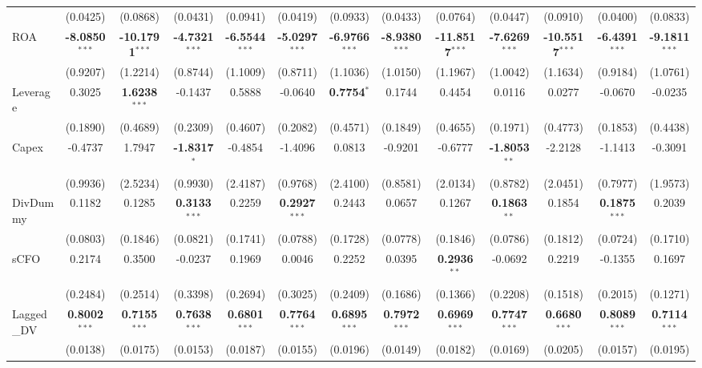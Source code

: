 \documentclass[11pt,a4paper]{article}
\begin{document}
\begin{table}[htbp]
\begin{tabular}{lcccccccccccc}
 & (0.0425) & (0.0868) & (0.0431) & (0.0941) & (0.0419) & (0.0933) & (0.0433) & (0.0764) & (0.0447) & (0.0910) & (0.0400) & (0.0833) \\
ROA & \textbf{-8.0850}$^{***}$ & \textbf{-10.1791}$^{***}$ & \textbf{-4.7321}$^{***}$ & \textbf{-6.5544}$^{***}$ & \textbf{-5.0297}$^{***}$ & \textbf{-6.9766}$^{***}$ & \textbf{-8.9380}$^{***}$ & \textbf{-11.8517}$^{***}$ & \textbf{-7.6269}$^{***}$ & \textbf{-10.5517}$^{***}$ & \textbf{-6.4391}$^{***}$ & \textbf{-9.1811}$^{***}$ \\
 & (0.9207) & (1.2214) & (0.8744) & (1.1009) & (0.8711) & (1.1036) & (1.0150) & (1.1967) & (1.0042) & (1.1634) & (0.9184) & (1.0761) \\
Leverage & 0.3025 & \textbf{1.6238}$^{***}$ & -0.1437 & 0.5888 & -0.0640 & \textbf{0.7754}$^{*}$ & 0.1744 & 0.4454 & 0.0116 & 0.0277 & -0.0670 & -0.0235 \\
 & (0.1890) & (0.4689) & (0.2309) & (0.4607) & (0.2082) & (0.4571) & (0.1849) & (0.4655) & (0.1971) & (0.4773) & (0.1853) & (0.4438) \\
Capex & -0.4737 & 1.7947 & \textbf{-1.8317}$^{*}$ & -0.4854 & -1.4096 & 0.0813 & -0.9201 & -0.6777 & \textbf{-1.8053}$^{**}$ & -2.2128 & -1.1413 & -0.3091 \\
 & (0.9936) & (2.5234) & (0.9930) & (2.4187) & (0.9768) & (2.4100) & (0.8581) & (2.0134) & (0.8782) & (2.0451) & (0.7977) & (1.9573) \\
DivDummy & 0.1182 & 0.1285 & \textbf{0.3133}$^{***}$ & 0.2259 & \textbf{0.2927}$^{***}$ & 0.2443 & 0.0657 & 0.1267 & \textbf{0.1863}$^{**}$ & 0.1854 & \textbf{0.1875}$^{***}$ & 0.2039 \\
 & (0.0803) & (0.1846) & (0.0821) & (0.1741) & (0.0788) & (0.1728) & (0.0778) & (0.1846) & (0.0786) & (0.1812) & (0.0724) & (0.1710) \\
sCFO & 0.2174 & 0.3500 & -0.0237 & 0.1969 & 0.0046 & 0.2252 & 0.0395 & \textbf{0.2936}$^{**}$ & -0.0692 & 0.2219 & -0.1355 & 0.1697 \\
 & (0.2484) & (0.2514) & (0.3398) & (0.2694) & (0.3025) & (0.2409) & (0.1686) & (0.1366) & (0.2208) & (0.1518) & (0.2015) & (0.1271) \\
Lagged\_DV & \textbf{0.8002}$^{***}$ & \textbf{0.7155}$^{***}$ & \textbf{0.7638}$^{***}$ & \textbf{0.6801}$^{***}$ & \textbf{0.7764}$^{***}$ & \textbf{0.6895}$^{***}$ & \textbf{0.7972}$^{***}$ & \textbf{0.6969}$^{***}$ & \textbf{0.7747}$^{***}$ & \textbf{0.6680}$^{***}$ & \textbf{0.8089}$^{***}$ & \textbf{0.7114}$^{***}$ \\
 & (0.0138) & (0.0175) & (0.0153) & (0.0187) & (0.0155) & (0.0196) & (0.0149) & (0.0182) & (0.0169) & (0.0205) & (0.0157) & (0.0195) \\

\end{tabular}
\end{table}
\end{document}
